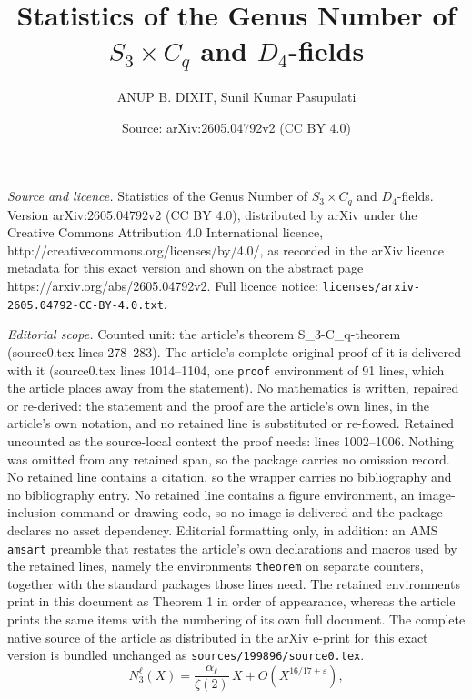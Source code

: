 \documentclass[10pt,a4paper]{amsart}
\title{Statistics of the Genus Number of $S_3 \times C_q$ and $D_4$-fields}
\author{ANUP B. DIXIT, Sunil Kumar Pasupulati}
\date{Source: arXiv:2605.04792v2 (CC BY 4.0)}
\begin{document}
\maketitle

\noindent\emph{Source and licence.} Statistics of the Genus Number of $S_3 \times C_q$ and $D_4$-fields. Version arXiv:2605.04792v2 (CC BY 4.0), distributed by arXiv under the Creative Commons Attribution 4.0 International licence, http://creativecommons.org/licenses/by/4.0/, as recorded in the arXiv licence metadata for this exact version and shown on the abstract page https://arxiv.org/abs/2605.04792v2. Full licence notice: \texttt{licenses/arxiv-2605.04792-CC-BY-4.0.txt}.\par\smallskip

\noindent\textit{Editorial scope.} Counted unit: the article's theorem S\_3-C\_q-theorem (source0.tex lines 278--283). The article's complete original proof of it is delivered with it (source0.tex lines 1014--1104, one \texttt{proof} environment of 91 lines, which the article places away from the statement). No mathematics is written, repaired or re-derived: the statement and the proof are the article's own lines, in the article's own notation, and no retained line is substituted or re-flowed.  Retained uncounted as the source-local context the proof needs: lines 1002--1006.  Nothing was omitted from any retained span, so the package carries no omission record.  No retained line contains a citation, so the wrapper carries no bibliography and no bibliography entry.  No retained line contains a figure environment, an image-inclusion command or drawing code, so no image is delivered and the package declares no asset dependency.  Editorial formatting only, in addition: an AMS \texttt{amsart} preamble that restates the article's own declarations and macros used by the retained lines, namely the environments \texttt{theorem} on separate counters, together with the standard packages those lines need.  The retained environments print in this document as Theorem 1 in order of appearance, whereas the article prints the same items with the numbering of its own full document.  The complete native source of the article as distributed in the arXiv e-print for this exact version is bundled unchanged as \texttt{sources/199896/source0.tex}.
\begin{equation}\label{lemma:count-genus-number-S_3}
    N_3^{\ell}(X)
    = \frac{\alpha_{\ell}}{\zeta(2)}\,X
      + O\!\left(X^{16/17+\varepsilon}\right),
\end{equation}
\end{document}
